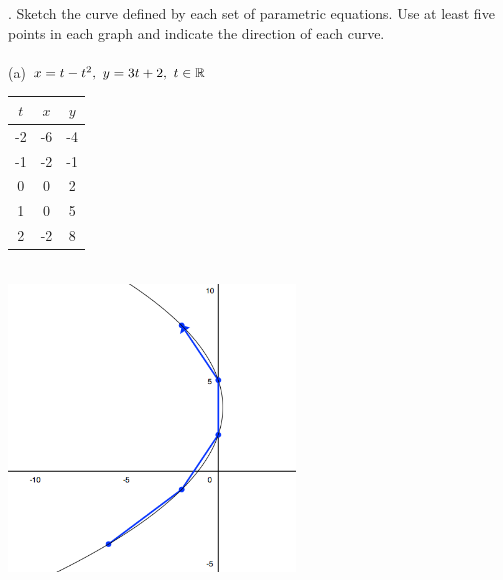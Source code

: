 \documentclass[11pt]{exam}
\begin{document}
. Sketch the curve defined by each set of parametric equations. Use at least five points in each graph and indicate the direction of each curve. \\
\\
\indent (a) $x = t - t^2,\ y = 3t + 2,\ t \in \Bbb{R} $\\
\newline
\newline
\def\arraystretch{1.5}
\begin{tabular}{ c|c|c }
  $t$ & $x$ & $y$ \\
  \hline
  -2 & -6 & -4 \\
  -1 & -2 & -1 \\
   0 &  0 &  2 \\
   1 &  0 &  5 \\
   2 & -2 &  8 \\
\end{tabular}\\
\includegraphics[width=3in]{g1a.png}
\end{document}
